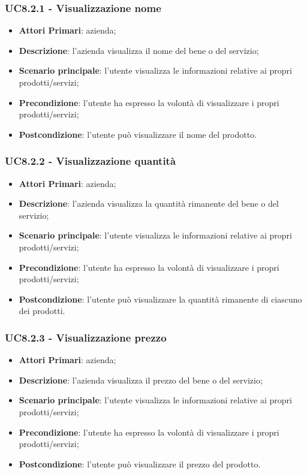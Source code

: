 \subsubsection{UC8.2.1 - Visualizzazione nome}
\begin{itemize}
	\item \textbf{Attori Primari}: azienda;
	\item \textbf{Descrizione}: l'azienda visualizza il nome del bene o del servizio;
	\item \textbf{Scenario principale}: l'utente visualizza le informazioni relative ai propri prodotti/servizi;
	\item \textbf{Precondizione}: l'utente ha espresso la volontà di visualizzare i propri prodotti/servizi;
	\item \textbf{Postcondizione}: l'utente può visualizzare il nome del prodotto.
\end{itemize}
\subsubsection{UC8.2.2 - Visualizzazione quantità}
\begin{itemize}
	\item \textbf{Attori Primari}: azienda;
	\item \textbf{Descrizione}: l'azienda visualizza la quantità rimanente del bene o del servizio;
	\item \textbf{Scenario principale}: l'utente visualizza le informazioni relative ai propri prodotti/servizi;
	\item \textbf{Precondizione}: l'utente ha espresso la volontà di visualizzare i propri prodotti/servizi;
	\item \textbf{Postcondizione}: l'utente può visualizzare la quantità rimanente di ciascuno dei prodotti.
\end{itemize}
\subsubsection{UC8.2.3 - Visualizzazione prezzo}
\begin{itemize}
	\item \textbf{Attori Primari}: azienda;
	\item \textbf{Descrizione}: l'azienda visualizza il prezzo del bene o del servizio;
	\item \textbf{Scenario principale}: l'utente visualizza le informazioni relative ai propri prodotti/servizi;
	\item \textbf{Precondizione}: l'utente ha espresso la volontà di visualizzare i propri prodotti/servizi;
	\item \textbf{Postcondizione}: l'utente può visualizzare il prezzo del prodotto.
\end{itemize}
